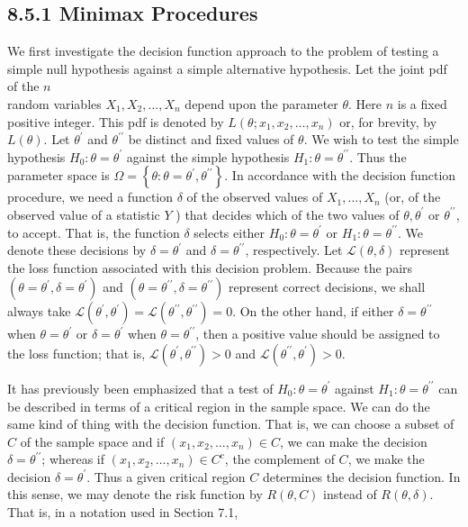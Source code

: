 \subsection*{8.5.1 Minimax Procedures}
We first investigate the decision function approach to the problem of testing a simple null hypothesis against a simple alternative hypothesis. Let the joint pdf of the $n$\\
random variables $X_{1}, X_{2}, \ldots, X_{n}$ depend upon the parameter $\theta$. Here $n$ is a fixed positive integer. This pdf is denoted by $L\left(\theta ; x_{1}, x_{2}, \ldots, x_{n}\right)$ or, for brevity, by $L(\theta)$. Let $\theta^{\prime}$ and $\theta^{\prime \prime}$ be distinct and fixed values of $\theta$. We wish to test the simple hypothesis $H_{0}: \theta=\theta^{\prime}$ against the simple hypothesis $H_{1}: \theta=\theta^{\prime \prime}$. Thus the parameter space is $\Omega=\left\{\theta: \theta=\theta^{\prime}, \theta^{\prime \prime}\right\}$. In accordance with the decision function procedure, we need a function $\delta$ of the observed values of $X_{1}, \ldots, X_{n}$ (or, of the observed value of a statistic $Y$ ) that decides which of the two values of $\theta, \theta^{\prime}$ or $\theta^{\prime \prime}$, to accept. That is, the function $\delta$ selects either $H_{0}: \theta=\theta^{\prime}$ or $H_{1}: \theta=\theta^{\prime \prime}$. We denote these decisions by $\delta=\theta^{\prime}$ and $\delta=\theta^{\prime \prime}$, respectively. Let $\mathcal{L}(\theta, \delta)$ represent the loss function associated with this decision problem. Because the pairs $\left(\theta=\theta^{\prime}, \delta=\theta^{\prime}\right)$ and $\left(\theta=\theta^{\prime \prime}, \delta=\theta^{\prime \prime}\right)$ represent correct decisions, we shall always take $\mathcal{L}\left(\theta^{\prime}, \theta^{\prime}\right)=\mathcal{L}\left(\theta^{\prime \prime}, \theta^{\prime \prime}\right)=0$. On the other hand, if either $\delta=\theta^{\prime \prime}$ when $\theta=\theta^{\prime}$ or $\delta=\theta^{\prime}$ when $\theta=\theta^{\prime \prime}$, then a positive value should be assigned to the loss function; that is, $\mathcal{L}\left(\theta^{\prime}, \theta^{\prime \prime}\right)>0$ and $\mathcal{L}\left(\theta^{\prime \prime}, \theta^{\prime}\right)>0$.

It has previously been emphasized that a test of $H_{0}: \theta=\theta^{\prime}$ against $H_{1}: \theta=\theta^{\prime \prime}$ can be described in terms of a critical region in the sample space. We can do the same kind of thing with the decision function. That is, we can choose a subset of $C$ of the sample space and if $\left(x_{1}, x_{2}, \ldots, x_{n}\right) \in C$, we can make the decision $\delta=\theta^{\prime \prime}$; whereas if $\left(x_{1}, x_{2}, \ldots, x_{n}\right) \in C^{c}$, the complement of $C$, we make the decision $\delta=\theta^{\prime}$. Thus a given critical region $C$ determines the decision function. In this sense, we may denote the risk function by $R(\theta, C)$ instead of $R(\theta, \delta)$. That is, in a notation used in Section 7.1,

